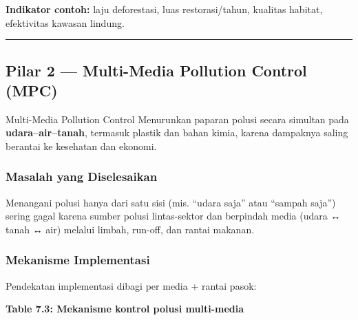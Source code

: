\documentclass[
  letterpaper,
  DIV=11,
  numbers=noendperiod]{scrreprt}
\begin{document}
\textbf{Indikator contoh:} laju deforestasi, luas restorasi/tahun,
kualitas habitat, efektivitas kawasan lindung.

\begin{center}\rule{0.5\linewidth}{0.5pt}\end{center}

\subsection{Pilar 2 --- Multi-Media Pollution Control
(MPC)}\label{pilar-2-multi-media-pollution-control-mpc}

Multi-Media Pollution Control Menurunkan paparan polusi secara simultan
pada \textbf{udara--air--tanah}, termasuk plastik dan bahan kimia,
karena dampaknya saling berantai ke kesehatan dan ekonomi.

\subsubsection{Masalah yang
Diselesaikan}\label{masalah-yang-diselesaikan-1}

\begin{tcolorbox}[enhanced jigsaw, colback=white, colframe=quarto-callout-warning-color-frame, left=2mm, arc=.35mm, bottomrule=.15mm, opacityback=0, opacitybacktitle=0.6, coltitle=black, toprule=.15mm, colbacktitle=quarto-callout-warning-color!10!white, breakable, titlerule=0mm, leftrule=.75mm, title=\textcolor{quarto-callout-warning-color}{\faExclamationTriangle}\hspace{0.5em}{Warning}, toptitle=1mm, bottomtitle=1mm, rightrule=.15mm]

Menangani polusi hanya dari satu sisi (mis. ``udara saja'' atau ``sampah
saja'') sering gagal karena sumber polusi lintas-sektor dan berpindah
media (udara ↔ tanah ↔ air) melalui limbah, run-off, dan rantai makanan.

\end{tcolorbox}

\subsubsection{Mekanisme Implementasi}\label{mekanisme-implementasi-1}

Pendekatan implementasi dibagi per media + rantai pasok:

\textbf{Table 7.3: Mekanisme kontrol polusi multi-media}
\end{document}

